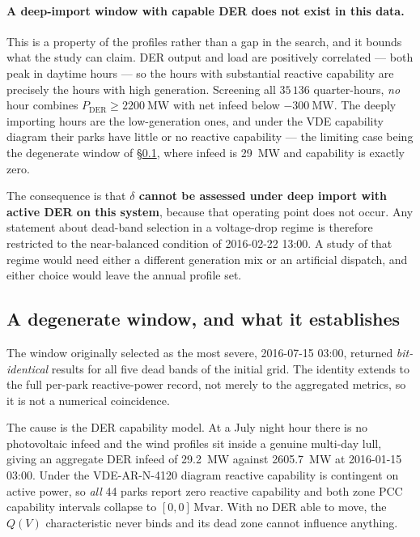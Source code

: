 \documentclass[11pt,a4paper]{article}
\newcommand{\Mvar}{\ensuremath{\mathrm{Mvar}}}
\newcommand{\dz}{\ensuremath{\delta}}
\begin{document}
\paragraph{A deep-import window with capable DER does not exist in this data.}
This is a property of the profiles rather than a gap in the search, and it
bounds what the study can claim. DER output and load are positively correlated
--- both peak in daytime hours --- so the hours with substantial reactive
capability are precisely the hours with high generation. Screening all
$35\,136$ quarter-hours, \emph{no} hour combines $P_\mathrm{DER} \geq
\SI{2200}{\mega\watt}$ with net infeed below $-\SI{300}{\mega\watt}$. The deeply
importing hours are the low-generation ones, and under the VDE capability
diagram their parks have little or no reactive capability --- the limiting case
being the degenerate window of \S\ref{sec:degenerate}, where infeed is
\SI{29}{\mega\watt} and capability is exactly zero.

The consequence is that \textbf{$\dz$ cannot be assessed under deep import with
active DER on this system}, because that operating point does not occur. Any
statement about dead-band selection in a voltage-drop regime is therefore
restricted to the near-balanced condition of 2016-02-22 13:00. A study of that
regime would need either a different generation mix or an artificial
dispatch, and either choice would leave the annual profile set.

\subsection{A degenerate window, and what it establishes}
\label{sec:degenerate}

The window originally selected as the most severe, 2016-07-15 03:00, returned
\emph{bit-identical} results for all five dead bands of the initial grid. The
identity extends to the full per-park reactive-power record, not merely to the
aggregated metrics, so it is not a numerical coincidence.

The cause is the DER capability model. At a July night hour there is no
photovoltaic infeed and the wind profiles sit inside a genuine multi-day lull,
giving an aggregate DER infeed of \SI{29.2}{\mega\watt} against
\SI{2605.7}{\mega\watt} at 2016-01-15 03:00. Under the VDE-AR-N-4120 diagram
reactive capability is contingent on active power, so \emph{all} 44 parks report
zero reactive capability and both zone PCC capability intervals collapse to
$[0,0]\,\si{\Mvar}$. With no DER able to move, the $Q(V)$ characteristic never
binds and its dead zone cannot influence anything.
\end{document}
